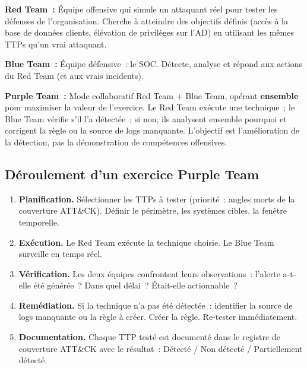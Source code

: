 \begin{boxdef}
\textbf{Red Team~:} Équipe offensive qui simule un attaquant réel pour
tester les défenses de l'organisation. Cherche à atteindre des objectifs
définis (accès à la base de données clients, élévation de privilèges
sur l'AD) en utilisant les mêmes TTPs qu'un vrai attaquant.
\end{boxdef}

\begin{boxdef}
\textbf{Blue Team~:} Équipe défensive~: le SOC. Détecte, analyse et
répond aux actions du Red Team (et aux vrais incidents).
\end{boxdef}

\begin{boxdef}
\textbf{Purple Team~:} Mode collaboratif Red Team + Blue Team, opérant
\textbf{ensemble} pour maximiser la valeur de l'exercice. Le Red Team
exécute une technique~; le Blue Team vérifie s'il l'a détectée~; si non,
ils analysent ensemble pourquoi et corrigent la règle ou la source de
logs manquante. L'objectif est l'amélioration de la détection,
pas la démonstration de compétences offensives.
\end{boxdef}

\subsection{Déroulement d'un exercice Purple Team}

\begin{enumerate}
  \item \textbf{Planification.} Sélectionner les TTPs à tester
        (priorité~: angles morts de la couverture ATT\&CK).
        Définir le périmètre, les systèmes cibles, la fenêtre temporelle.
  \item \textbf{Exécution.} Le Red Team exécute la technique choisie.
        Le Blue Team surveille en temps réel.
  \item \textbf{Vérification.} Les deux équipes confrontent leurs
        observations~: l'alerte a-t-elle été générée~?
        Dans quel délai~? Était-elle actionnable~?
  \item \textbf{Remédiation.} Si la technique n'a pas été détectée~:
        identifier la source de logs manquante ou la règle à créer.
        Créer la règle. Re-tester immédiatement.
  \item \textbf{Documentation.} Chaque TTP testé est documenté dans
        le registre de couverture ATT\&CK avec le résultat~:
        Détecté / Non détecté / Partiellement détecté.
\end{enumerate}

